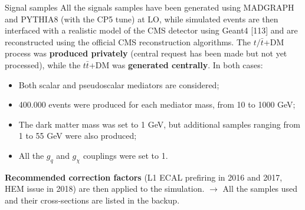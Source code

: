 \documentclass[8pt]{beamer}
\begin{document}
\begin{frame}{Signal samples}
\justifying
All the \alert{signals samples have been generated} using MADGRAPH and PYTHIA8 (with the CP5 tune) at LO, while simulated events are then interfaced with a realistic model of the CMS detector using Geant4 [113] and are reconstructed using the official CMS reconstruction algorithms. \vfill
The $t/\bar t$+DM process was \textbf{produced privately} (central request has been made but not yet processed), while the $t \bar t$+DM was \textbf{generated centrally}. In both cases:

\begin{itemize}
\item Both scalar and pseudoscalar mediators are considered;
\item 400.000 events were produced for each mediator mass, from 10 to 1000 GeV;
\item The dark matter mass was set to 1 GeV, but additional samples ranging from 1 to 55 GeV were also produced;
\item All the $g_q$ and $g_\chi$ couplings were set to 1.
\end{itemize} \vfill

\textbf{Recommended correction factors} (L1 ECAL prefiring in 2016 and 2017, HEM issue in 2018) are then applied to the simulation. \vfill 
$\rightarrow$ All the samples used and their cross-sections are listed in the backup. \vfill
\end{frame}
\end{document}
